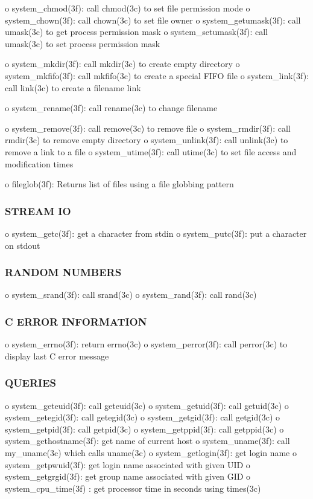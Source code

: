o system\+\_\+chmod(3f)\+: call chmod(3c) to set file permission mode o system\+\_\+chown(3f)\+: call chown(3c) to set file owner o system\+\_\+getumask(3f)\+: call umask(3c) to get process permission mask o system\+\_\+setumask(3f)\+: call umask(3c) to set process permission mask

o system\+\_\+mkdir(3f)\+: call mkdir(3c) to create empty directory o system\+\_\+mkfifo(3f)\+: call mkfifo(3c) to create a special F\+I\+FO file o system\+\_\+link(3f)\+: call link(3c) to create a filename link

o system\+\_\+rename(3f)\+: call rename(3c) to change filename

o system\+\_\+remove(3f)\+: call remove(3c) to remove file o system\+\_\+rmdir(3f)\+: call rmdir(3c) to remove empty directory o system\+\_\+unlink(3f)\+: call unlink(3c) to remove a link to a file o system\+\_\+utime(3f)\+: call utime(3c) to set file access and modification times

o fileglob(3f)\+: Returns list of files using a file globbing pattern

\subsubsection*{S\+T\+R\+E\+AM IO}

o system\+\_\+getc(3f)\+: get a character from stdin o system\+\_\+putc(3f)\+: put a character on stdout \subsubsection*{R\+A\+N\+D\+OM N\+U\+M\+B\+E\+RS}

o system\+\_\+srand(3f)\+: call srand(3c) o system\+\_\+rand(3f)\+: call rand(3c) \subsubsection*{C E\+R\+R\+OR I\+N\+F\+O\+R\+M\+A\+T\+I\+ON}

o system\+\_\+errno(3f)\+: return errno(3c) o system\+\_\+perror(3f)\+: call perror(3c) to display last C error message \subsubsection*{Q\+U\+E\+R\+I\+ES}

o system\+\_\+geteuid(3f)\+: call geteuid(3c) o system\+\_\+getuid(3f)\+: call getuid(3c) o system\+\_\+getegid(3f)\+: call getegid(3c) o system\+\_\+getgid(3f)\+: call getgid(3c) o system\+\_\+getpid(3f)\+: call getpid(3c) o system\+\_\+getppid(3f)\+: call getppid(3c) o system\+\_\+gethostname(3f)\+: get name of current host o system\+\_\+uname(3f)\+: call my\+\_\+uname(3c) which calls uname(3c) o system\+\_\+getlogin(3f)\+: get login name o system\+\_\+getpwuid(3f)\+: get login name associated with given U\+ID o system\+\_\+getgrgid(3f)\+: get group name associated with given G\+ID o system\+\_\+cpu\+\_\+time(3f) \+: get processor time in seconds using times(3c)

